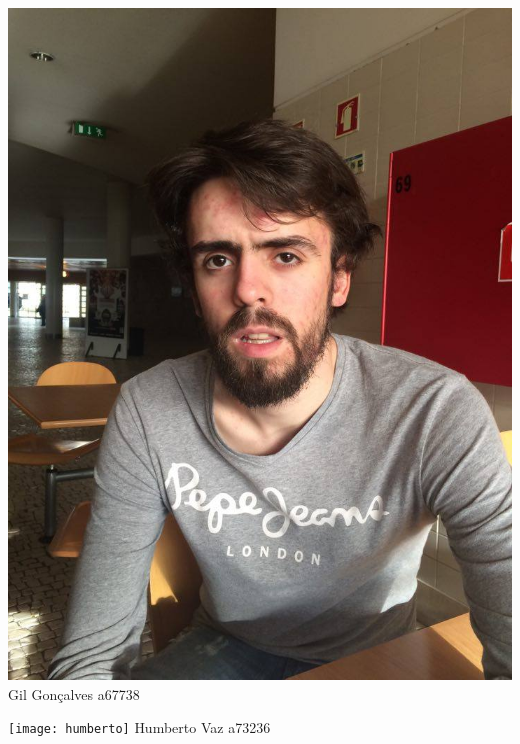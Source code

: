 \begin{titlepage}
\begin{center}
\begin{minipage}[b]{.1\textwidth}
	\includegraphics[scale=0.1]{gil}
	\tiny{Gil Gonçalves a67738}
\end{minipage}
\hfill
\begin{minipage}[b]{.1\textwidth}
	\texttt{[image: humberto]}
	\tiny{Humberto Vaz a73236 }
\end{minipage} 
\hfill

\end{center}
\end{titlepage}

